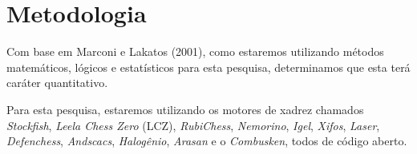 


\chapter{Metodologia}
Com base em Marconi e Lakatos (2001), como estaremos utilizando métodos matemáticos, lógicos e estatísticos para esta pesquisa,
determinamos que esta terá caráter quantitativo.

Para esta pesquisa, estaremos utilizando os motores de xadrez chamados \textit{Stockfish}, \textit{Leela Chess Zero} (LCZ),
\textit{RubiChess}, \textit{Nemorino}, \textit{Igel}, \textit{Xifos}, \textit{Laser}, \textit{Defenchess}, \textit{Andscacs},
\textit{Halogênio}, \textit{Arasan} e o \textit{Combusken}, todos de código aberto.

